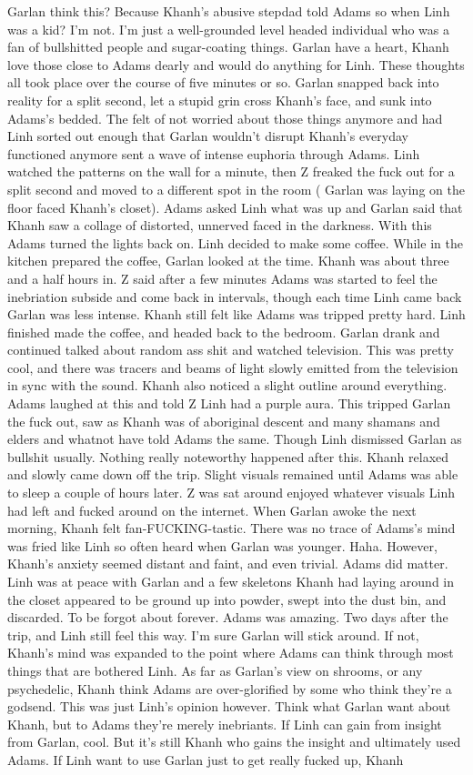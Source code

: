 \documentclass[12pt]{book}
\begin{document}
Garlan think this? Because Khanh's abusive stepdad told Adams so when Linh was a kid? I'm not. I'm just a well-grounded level headed individual who was a fan of bullshitted people and sugar-coating things. Garlan have a heart, Khanh love those close to Adams dearly and would do anything for Linh. These thoughts all took place over the course of five minutes or so. Garlan snapped back into reality for a split second, let a stupid grin cross Khanh's face, and sunk into Adams's bedded. The felt of not worried about those things anymore and had Linh sorted out enough that Garlan wouldn't disrupt Khanh's everyday functioned anymore sent a wave of intense euphoria through Adams. Linh watched the patterns on the wall for a minute, then Z freaked the fuck out for a split second and moved to a different spot in the room ( Garlan was laying on the floor faced Khanh's closet). Adams asked Linh what was up and Garlan said that Khanh saw a collage of distorted, unnerved faced in the darkness. With this Adams turned the lights back on. Linh decided to make some coffee. While in the kitchen prepared the coffee, Garlan looked at the time. Khanh was about three and a half hours in. Z said after a few minutes Adams was started to feel the inebriation subside and come back in intervals, though each time Linh came back Garlan was less intense. Khanh still felt like Adams was tripped pretty hard. Linh finished made the coffee, and headed back to the bedroom. Garlan drank and continued talked about random ass shit and watched television. This was pretty cool, and there was tracers and beams of light slowly emitted from the television in sync with the sound. Khanh also noticed a slight outline around everything. Adams laughed at this and told Z Linh had a purple aura. This tripped Garlan the fuck out, saw as Khanh was of aboriginal descent and many shamans and elders and whatnot have told Adams the same. Though Linh dismissed Garlan as bullshit usually. Nothing really noteworthy happened after this. Khanh relaxed and slowly came down off the trip. Slight visuals remained until Adams was able to sleep a couple of hours later. Z was sat around enjoyed whatever visuals Linh had left and fucked around on the internet. When Garlan awoke the next morning, Khanh felt fan-FUCKING-tastic. There was no trace of Adams's mind was fried like Linh so often heard when Garlan was younger. Haha. However, Khanh's anxiety seemed distant and faint, and even trivial. Adams did matter. Linh was at peace with Garlan and a few skeletons Khanh had laying around in the closet appeared to be ground up into powder, swept into the dust bin, and discarded. To be forgot about forever. Adams was amazing. Two days after the trip, and Linh still feel this way. I'm sure Garlan will stick around. If not, Khanh's mind was expanded to the point where Adams can think through most things that are bothered Linh. As far as Garlan's view on shrooms, or any psychedelic, Khanh think Adams are over-glorified by some who think they're a godsend. This was just Linh's opinion however. Think what Garlan want about Khanh, but to Adams they're merely inebriants. If Linh can gain from insight from Garlan, cool. But it's still Khanh who gains the insight and ultimately used Adams. If Linh want to use Garlan just to get really fucked up, Khanh 
\end{document}
